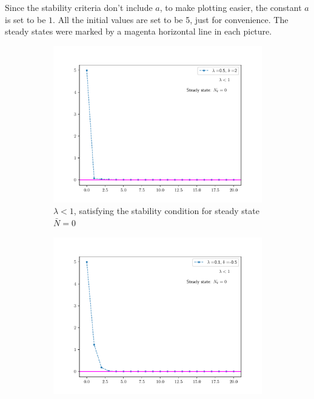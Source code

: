 \begin{homeworkProblem}
Since the stability criteria don't include $a$, to make plotting
easier, the constant $a$ is set to be $1$. All the initial values are set to be 
5, just for convenience. The steady states were marked by a magenta horizontal
line in each picture.
\begin{figure}[htbp]
\begin{subfigure}[t]{0.45\linewidth}
    \includegraphics[scale = 0.5]{fig/fig8(c)(1).pdf}
    \caption{$\lambda < 1$, satisfying the stability
    condition for steady state $\bar N = 0$}
\end{subfigure}
\hfill
\begin{subfigure}[t]{0.45\linewidth}
    \includegraphics[scale = 0.5]{fig/fig8(c)(2).pdf}

\end{subfigure}
\end{figure}
\end{homeworkProblem}
